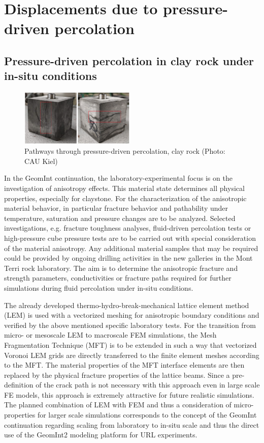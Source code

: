 \section{Displacements due to pressure-driven percolation}

\subsection{Pressure-driven percolation in clay rock under in-situ conditions}

\begin{figure}
\vspace{-5mm}
\centering
\includegraphics[width=0.49\textwidth]{figures/GeomInt_AP2_CAU}
\caption{Pathways through pressure-driven percolation, clay rock (Photo: CAU Kiel)}
\label{fig:syn-percolation}
\end{figure}
In the GeomInt continuation, the laboratory-experimental focus is on the investigation of anisotropy effects. This material state determines all physical properties, especially for claystone. For the characterization of the anisotropic material behavior, in particular fracture behavior and pathability under temperature, saturation and pressure changes are to be analyzed. Selected investigations, e.g. fracture toughness analyses, fluid-driven percolation tests or high-pressure cube pressure tests are to be carried out with special consideration of the material anisotropy. Any additional material samples that may be required could be provided by ongoing drilling activities in the new galleries in the Mont Terri rock laboratory. The aim is to determine the anisotropic fracture and strength parameters, conductivities or fracture paths required for further simulations during fluid percolation under in-situ conditions.

The already developed thermo-hydro-break-mechanical lattice element method (LEM) is used with a vectorized meshing for anisotropic boundary conditions and verified by the above mentioned specific laboratory tests. 
%
For the transition from micro- or mesoscale LEM to macroscale FEM simulations, the \glqq Mesh Fragmentation Technique (MFT)\grqq{} is to be extended in such a way that vectorized Voronoi LEM grids are directly transferred to the finite element meshes according to the MFT. The material properties of the MFT interface elements are then replaced by the physical fracture properties of the lattice beams. Since a pre-definition of the crack path is not necessary with this approach even in large scale FE models, this approach is extremely attractive for future realistic simulations.
%
The planned combination of LEM with FEM and thus a consideration of micro-properties for larger scale simulations corresponds to the concept of the GeomInt continuation regarding scaling from laboratory to in-situ scale and thus the direct use of the GeomInt2 modeling platform for URL experiments.

